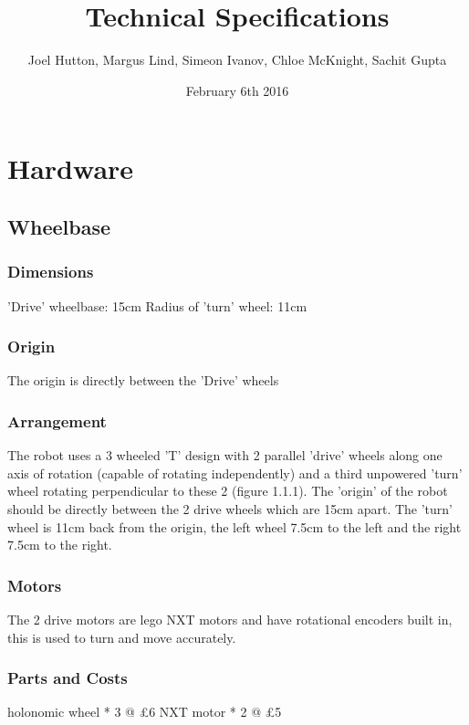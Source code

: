 \documentclass[a4paper]{article}
\title{Technical Specifications}
\author{Joel Hutton, Margus Lind, Simeon Ivanov, Chloe McKnight, Sachit Gupta}
\date{February 6th 2016}
\begin{document}
\maketitle
\section{Hardware}

\subsection{Wheelbase}
\subsubsection{Dimensions}
'Drive' wheelbase:		15cm \newline
Radius of 'turn' wheel: 11cm
\subsubsection{Origin}
The origin is directly between the 'Drive' wheels
\subsubsection{Arrangement}
The robot uses a 3 wheeled 'T' design with 2 parallel 'drive' wheels along one axis of rotation (capable of rotating independently) and a third unpowered 'turn' wheel rotating perpendicular to these 2 (figure 1.1.1). The 'origin' of the robot should be 
directly between the 2 drive wheels which are 15cm apart. The 'turn' wheel 
is 11cm back from the origin, the left wheel 7.5cm to the left and the right
7.5cm to the right. 

\subsubsection{Motors}
The 2 drive motors are lego NXT motors and have rotational encoders built in, this is used to turn and move accurately. 

\subsubsection{Parts and Costs}
holonomic wheel * 3 @ £6 \newline
NXT motor       * 2 @ £5 \newline
\end{document}
